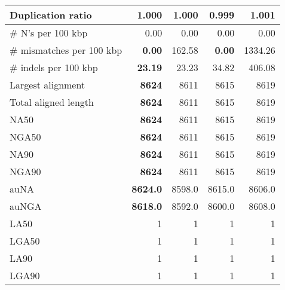 \documentclass[12pt,a4paper]{article}
\begin{document}
\begin{table}[ht]
\begin{center}
\begin{tabular}{|l*{4}{|r}|}
Duplication ratio & 1.000 & 1.000 & {\bf 0.999} & 1.001 \\ \hline
\# N's per 100 kbp & 0.00 & 0.00 & 0.00 & 0.00 \\ \hline
\# mismatches per 100 kbp & {\bf 0.00} & 162.58 & {\bf 0.00} & 1334.26 \\ \hline
\# indels per 100 kbp & {\bf 23.19} & 23.23 & 34.82 & 406.08 \\ \hline
Largest alignment & {\bf 8624} & 8611 & 8615 & 8619 \\ \hline
Total aligned length & {\bf 8624} & 8611 & 8615 & 8619 \\ \hline
NA50 & {\bf 8624} & 8611 & 8615 & 8619 \\ \hline
NGA50 & {\bf 8624} & 8611 & 8615 & 8619 \\ \hline
NA90 & {\bf 8624} & 8611 & 8615 & 8619 \\ \hline
NGA90 & {\bf 8624} & 8611 & 8615 & 8619 \\ \hline
auNA & {\bf 8624.0} & 8598.0 & 8615.0 & 8606.0 \\ \hline
auNGA & {\bf 8618.0} & 8592.0 & 8600.0 & 8608.0 \\ \hline
LA50 & 1 & 1 & 1 & 1 \\ \hline
LGA50 & 1 & 1 & 1 & 1 \\ \hline
LA90 & 1 & 1 & 1 & 1 \\ \hline
LGA90 & 1 & 1 & 1 & 1 \\ \hline
\end{tabular}
\end{center}
\end{table}
\end{document}
